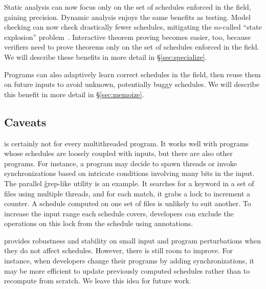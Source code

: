  Static analysis can now focus
only on the set of schedules enforced in the field, gaining
precision.  Dynamic analysis enjoys the same benefits as testing.  Model
checking can now check drastically fewer schedules, mitigating the so-called
``state explosion'' problem~\cite{clarke:ModelChecking}.  Interactive theorem proving becomes easier, too,
because verifiers need to prove theorems only on the set of schedules
enforced in the field.  We will describe these benefits in more detail in
\S\ref{sec:specialize}.

  Programs can also adaptively learn correct
schedules in the field, then reuse them on future inputs to avoid unknown,
potentially buggy schedules.  We will describe this benefit in more
detail in \S\ref{sec:memoize}.

\subsection{Caveats}

\smt is certainly not for every multithreaded program.  It works well with
programs whose schedules are loosely coupled with inputs, but there are also other programs.  For instance, a program may decide to spawn
threads or invoke synchronizations based on intricate conditions involving many bits in the input.
The parallel \v{grep}-like utility \pfscan is an example.  It searches for a
keyword in a set of files using multiple threads, and for each match, it
grabs a lock to increment a counter.  A schedule computed on one set of
files is unlikely to suit another.
To increase the input range each schedule covers, developers can
exclude the operations on this lock from the schedule using annotations.


\smt provides robustness and stability on small input and program
perturbations when they do not affect schedules.  However, there
is still room to improve.  For instance, when developers change their
programs by adding synchronizations, it may be more efficient to
update previously computed schedules rather than to recompute from
scratch. We leave this idea for future work.
